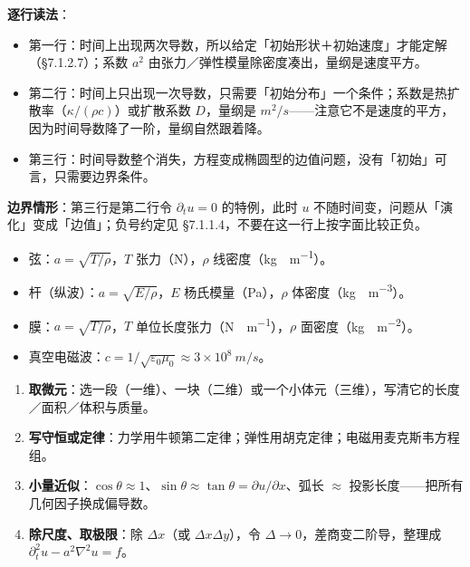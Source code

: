 \textbf{逐行读法}：

\begin{itemize}
\item 第一行：时间上出现两次导数，所以给定「初始形状＋初始速度」才能定解（§7.1.2.7）；系数 $a^2$ 由张力／弹性模量除密度凑出，量纲是速度平方。
\item 第二行：时间上只出现一次导数，只需要「初始分布」一个条件；系数是热扩散率（$\kappa/(\rho c)$）或扩散系数 $D$，量纲是 $\unit{m^2/s}$——注意它不是速度的平方，因为时间导数降了一阶，量纲自然跟着降。
\item 第三行：时间导数整个消失，方程变成椭圆型的边值问题，没有「初始」可言，只需要边界条件。
\end{itemize}

\textbf{边界情形}：第三行是第二行令 $\partial_tu=0$ 的特例，此时 $u$ 不随时间变，问题从「演化」变成「边值」；负号约定见 §7.1.1.4，不要在这一行上按字面比较正负。

\label{sec:718}



\begin{itemize}
\item 弦：$a=\sqrt{T/\rho}$，$T$ 张力（\unit{N}），$\rho$ 线密度（\unit{kg\cdot m^{-1}}）。
\item 杆（纵波）：$a=\sqrt{E/\rho}$，$E$ 杨氏模量（\unit{Pa}），$\rho$ 体密度（\unit{kg\cdot m^{-3}}）。
\item 膜：$a=\sqrt{T/\rho}$，$T$ 单位长度张力（\unit{N\cdot m^{-1}}），$\rho$ 面密度（\unit{kg\cdot m^{-2}}）。
\item 真空电磁波：$c=1/\sqrt{\varepsilon_0\mu_0}\approx3\times10^{8}\ \unit{m/s}$。
\end{itemize}


\begin{enumerate}
\item \textbf{取微元}：选一段（一维）、一块（二维）或一个小体元（三维），写清它的长度／面积／体积与质量。
\item \textbf{写守恒或定律}：力学用牛顿第二定律；弹性用胡克定律；电磁用麦克斯韦方程组。
\item \textbf{小量近似}：$\cos\theta\approx1$、$\sin\theta\approx\tan\theta=\partial u/\partial x$、弧长 $\approx$ 投影长度——把所有几何因子换成偏导数。
\item \textbf{除尺度、取极限}：除 $\Delta x$（或 $\Delta x\Delta y$），令 $\Delta\to0$，差商变二阶导，整理成 $\partial_t^2u-a^2\nabla^2u=f$。
\end{enumerate}

